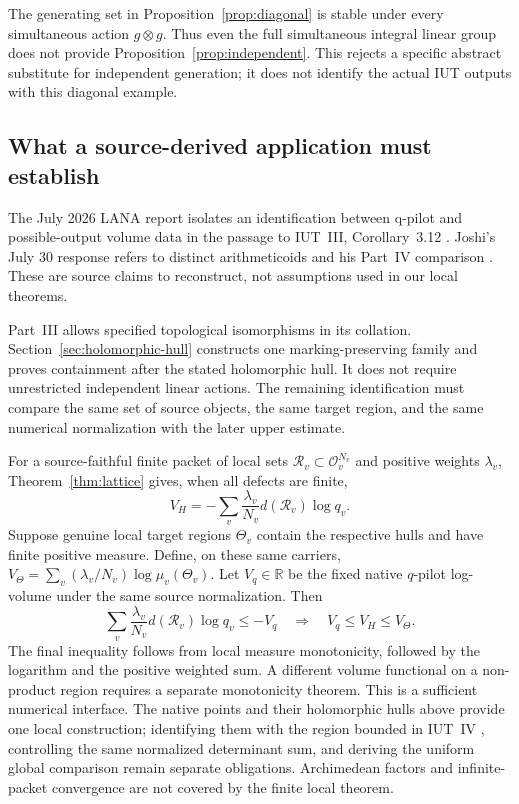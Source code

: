 \documentclass[11pt]{amsart}
\theoremstyle{definition}
\theoremstyle{remark}
\newcommand{\R}{\mathbb R}
\newcommand{\OO}{\mathcal O}
\begin{document}
The generating set in Proposition~\ref{prop:diagonal} is stable under every
simultaneous action $g\otimes g$. Thus even the full simultaneous integral
linear group does not provide Proposition~\ref{prop:independent}.
This rejects a specific abstract substitute for independent generation; it
does not identify the actual IUT outputs with this diagonal example.



\subsection{What a source-derived application must establish}
The July 2026 LANA report \cite{LANA} isolates an identification between
q-pilot and possible-output volume data in the passage to IUT~III,
Corollary~3.12 \cite{IUT3}. Joshi's July 30 response \cite{JoshiResponse}
refers to distinct arithmeticoids and his Part~IV comparison
\cite[Theorem~6.10.1]{JoshiIV}. These are source claims to reconstruct,
not assumptions used in our local theorems.

Part~III \cite[Proposition~9.7.5.1]{JoshiIII} allows specified topological
isomorphisms in its collation. Section~\ref{sec:holomorphic-hull} constructs
one marking-preserving family and proves containment after the stated
holomorphic hull. It does not require unrestricted independent linear
actions. The remaining identification must compare the same set of source
objects, the same target region, and the same numerical normalization
with the later upper estimate.

For a source-faithful finite packet of local sets
$\mathcal R_v\subset\OO_v^{N_v}$ and positive weights $\lambda_v$,
Theorem~\ref{thm:lattice} gives, when all defects are finite,
\[
 V_H=-\sum_v\frac{\lambda_v}{N_v}d(\mathcal R_v)\log q_v.
\]
Suppose genuine local target regions $\Theta_v$ contain the respective
hulls and have finite positive measure. Define, on these same carriers,
$V_\Theta=\sum_v(\lambda_v/N_v)\log\mu_v(\Theta_v)$.
Let $V_q\in\R$ be the fixed native $q$-pilot log-volume under the same
source normalization. Then
\[
 \sum_v\frac{\lambda_v}{N_v}d(\mathcal R_v)\log q_v\le -V_q
 \quad\Longrightarrow\quad V_q\le V_H\le V_\Theta.
\]
The final inequality follows from local measure monotonicity, followed by
the logarithm and the positive weighted sum. A different volume functional
on a non-product region requires a separate monotonicity theorem.
This is a sufficient numerical interface. The native points and their
holomorphic hulls above provide one local construction; identifying them
with the region bounded in IUT~IV \cite{IUT4}, controlling the same
normalized determinant sum, and deriving the uniform global comparison
remain separate obligations. Archimedean factors and infinite-packet
convergence are not covered by the finite local theorem.
\end{document}
